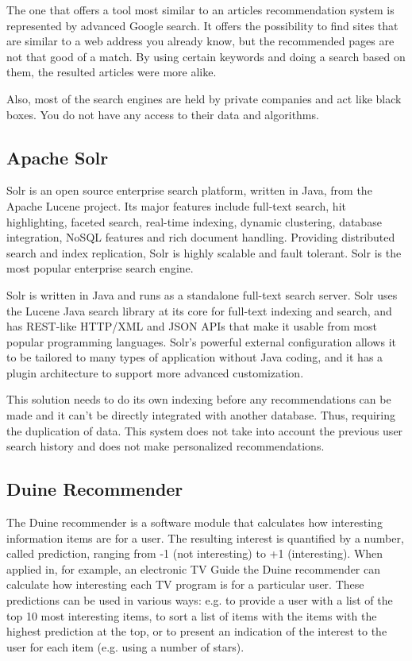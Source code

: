 The one that offers a tool most similar to an articles recommendation system is represented by advanced Google search. It offers the possibility to find sites that are similar to a web address you already know, but the recommended pages are not that good of a match. By using certain keywords and doing a search based on them, the resulted articles were more alike.

Also, most of the search engines are held by private companies and act like black boxes. You do not have any access to their data and algorithms.


\subsection{Apache Solr}

Solr is an open source enterprise search platform, written in Java, from the Apache Lucene project. Its major features include full-text search, hit highlighting, faceted search, real-time indexing, dynamic clustering, database integration, NoSQL features and rich document handling. Providing distributed search and index replication, Solr is highly scalable and fault tolerant. Solr is the most popular enterprise search engine. 

Solr is written in Java and runs as a standalone full-text search server. Solr uses the Lucene Java search library at its core for full-text indexing and search, and has REST-like HTTP/XML and JSON APIs that make it usable from most popular programming languages. Solr's powerful external configuration allows it to be tailored to many types of application without Java coding, and it has a plugin architecture to support more advanced customization.

This solution needs to do its own indexing before any recommendations can be made and it can't be directly integrated with another database. Thus, requiring the duplication of data. This system does not take into account the previous user search history and does not make personalized recommendations.

\subsection{Duine Recommender }
The Duine recommender is a software module that calculates how interesting information items are for a user. The resulting interest is quantified by a number, called prediction, ranging from -1 (not interesting) to +1 (interesting). When applied in, for example, an electronic TV Guide the Duine recommender can calculate how interesting each TV program is for a particular user. These predictions can be used in various ways: e.g. to provide a user with a list of the top 10 most interesting items, to sort a list of items with the items with the highest prediction at the top, or to present an indication of the interest to the user for each item (e.g. using a number of stars).

